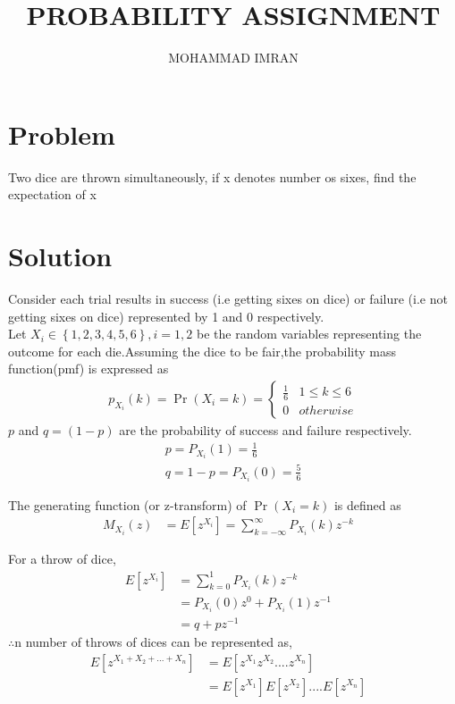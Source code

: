 \documentclass[a4paper,10pt,two column]{article}
\title{PROBABILITY ASSIGNMENT}
\author{MOHAMMAD IMRAN}
\providecommand{\cbrak}[1]{\ensuremath{\left\{#1\right\}}}
\providecommand{\sbrak}[1]{\ensuremath{{}\left[#1\right]}}
\providecommand{\pr}[1]{\ensuremath{\Pr\left(#1\right)}}
\begin{document}
\maketitle
\bigskip


\section{\textbf{Problem }}
Two dice are thrown simultaneously, if x denotes number os sixes, find the expectation of x


\section{\textbf{Solution }}
Consider each trial results in success (i.e getting sixes on dice) or failure (i.e not getting sixes on dice) represented by 1 and 0 respectively.
\\

Let $X_i \in \cbrak{1,2,3,4,5,6} , i = 1,2$ be the random variables representing the outcome for each die.Assuming the dice to be fair,the probability mass function(pmf) is expressed as
\\
\begin{align}
 p_{X_i}(k) = \Pr(X_i=k) =
\begin{cases}
\frac{1}{6} & 1 \leq k \leq 6 \\
0 & otherwise
\end{cases} 
\end{align}
$p$ and $q = (1 - p)$ are the probability of success and failure respectively.
\begin{align}
& p = P_{X_i}(1) = \frac{1}{6}&               \label{eq:1}
\\            
& q = 1 - p = P_{X_i}(0) = \frac{5}{6}&       \label{eq:2}
\end{align}



The generating function (or z-transform) of $\pr{X_i =k}$  is defined as 
\\
\begin{align}
M_{X_i}(z)& = E\sbrak{z^{X_i}} = \sum_{k=-\infty}^{\infty} P_{X_i}(k)z^{-k}&
\end{align}

For a throw of dice,
\begin{align}
E\sbrak{z^{X_i}}& = \sum_{k=0}^{1} P_{X_i}(k) z^{-k}&
\\
&=  P_{X_i}(0) z^{0} + P_{X_i}(1) z^{-1} &
\\
&= q+pz^{-1}&
\end{align}
$\therefore$n number of throws of dices can be represented as,
\\
\begin{align}
E\sbrak{z^{X_1+X_2+...+X_n}}&= E\sbrak{z^{X_1}z^{X_2}....z^{X_n}}& \nonumber
\\
&= E\sbrak{z^{X_1}}E\sbrak{z^{X_2}}....E\sbrak{z^{X_n}}&
\end{align} 
\end{document}
